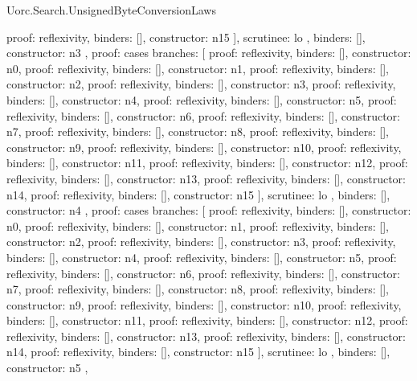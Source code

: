 \begin{lexlean}{Uorc.Search.UnsignedByteConversionLaws}
\begin{semanticmodule}
{{{{            {proof: reflexivity{}, binders: [], constructor: n15}
          ],
          scrutinee: lo
        },
        binders: [],
        constructor: n3
      },
      {
        proof: cases{
          branches: [
            {proof: reflexivity{}, binders: [], constructor: n0},
            {proof: reflexivity{}, binders: [], constructor: n1},
            {proof: reflexivity{}, binders: [], constructor: n2},
            {proof: reflexivity{}, binders: [], constructor: n3},
            {proof: reflexivity{}, binders: [], constructor: n4},
            {proof: reflexivity{}, binders: [], constructor: n5},
            {proof: reflexivity{}, binders: [], constructor: n6},
            {proof: reflexivity{}, binders: [], constructor: n7},
            {proof: reflexivity{}, binders: [], constructor: n8},
            {proof: reflexivity{}, binders: [], constructor: n9},
            {proof: reflexivity{}, binders: [], constructor: n10},
            {proof: reflexivity{}, binders: [], constructor: n11},
            {proof: reflexivity{}, binders: [], constructor: n12},
            {proof: reflexivity{}, binders: [], constructor: n13},
            {proof: reflexivity{}, binders: [], constructor: n14},
            {proof: reflexivity{}, binders: [], constructor: n15}
          ],
          scrutinee: lo
        },
        binders: [],
        constructor: n4
      },
      {
        proof: cases{
          branches: [
            {proof: reflexivity{}, binders: [], constructor: n0},
            {proof: reflexivity{}, binders: [], constructor: n1},
            {proof: reflexivity{}, binders: [], constructor: n2},
            {proof: reflexivity{}, binders: [], constructor: n3},
            {proof: reflexivity{}, binders: [], constructor: n4},
            {proof: reflexivity{}, binders: [], constructor: n5},
            {proof: reflexivity{}, binders: [], constructor: n6},
            {proof: reflexivity{}, binders: [], constructor: n7},
            {proof: reflexivity{}, binders: [], constructor: n8},
            {proof: reflexivity{}, binders: [], constructor: n9},
            {proof: reflexivity{}, binders: [], constructor: n10},
            {proof: reflexivity{}, binders: [], constructor: n11},
            {proof: reflexivity{}, binders: [], constructor: n12},
            {proof: reflexivity{}, binders: [], constructor: n13},
            {proof: reflexivity{}, binders: [], constructor: n14},
            {proof: reflexivity{}, binders: [], constructor: n15}
          ],
          scrutinee: lo
        },
        binders: [],
        constructor: n5
      },
      {
}}}
\end{semanticmodule}
\end{lexlean}
